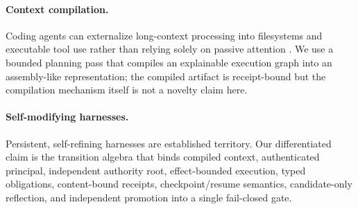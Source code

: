\paragraph{Context compilation.} Coding agents can externalize long-context
processing into filesystems and executable tool use rather than relying
solely on passive attention \cite{long_context_processors}. We use a
bounded planning pass that compiles an explainable execution graph into an
assembly-like representation; the compiled artifact is receipt-bound but
the compilation mechanism itself is not a novelty claim here.

\paragraph{Self-modifying harnesses.} Persistent, self-refining harnesses
are established territory. Our differentiated claim is the transition
algebra that binds compiled context, authenticated principal, independent
authority root, effect-bounded execution, typed obligations, content-bound
receipts, checkpoint/resume semantics, candidate-only reflection, and
independent promotion into a single fail-closed gate.
